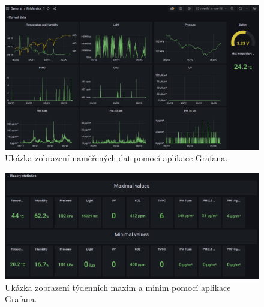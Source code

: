 \begin{figure}[h]
    \centering
    \includegraphics[width=\textwidth]{obrazky/grafana_dark.png}
    \caption{Ukázka zobrazení naměřených dat pomocí aplikace Grafana.}
    \label{fig_GrafanaCurrentData}
\end{figure}

\begin{figure}[h]
    \centering
    \includegraphics[width=\textwidth]{obrazky/grafana_weeklyStatisticsDark.png}
    \caption{Ukázka zobrazení týdenních maxim a minim pomocí aplikace Grafana.}
    \label{fig_Grafana}
\end{figure}